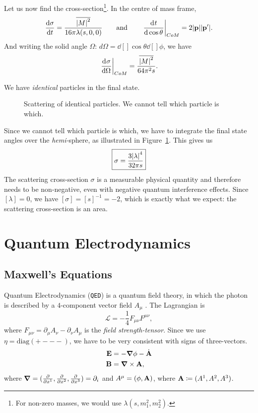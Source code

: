Let us now find the cross-section\footnote{For non-zero masses, we would use $\lambda(s, m_1^2, m_2^2)$.}. In the centre of mass frame, 
\begin{equation}
  \dv{\sigma}{t} = \frac{\overline{\abs{M}^2}}{16 \pi \lambda (s, {0, 0})} \qquad \text{and} \qquad \left.\dv[]{t}{\cos\theta}\right\rvert_{CoM} = 2 \abs{\vb{p}} \abs{\vb{p}'}.
\end{equation}
And writing the solid angle $\Omega$: $d\Omega = \dd[]{\cos\theta \dd[]{\phi}}$, we have
\begin{equation}
  \left.\dv[]{\sigma}{\Omega}\right\rvert_{CoM} = \frac{\overline{\abs{M}^2}}{64 \pi^2 s} .
\end{equation}

We have \emph{identical} particles in the final state.
\begin{figure}[tbhp]
  \centering
  \def\svgwidth{0.4\columnwidth}
  
  \caption{Scattering of identical particles. We cannot tell which particle is which.}
  \label{fig:l19f1}
\end{figure}
Since we cannot tell which particle is which, we have to integrate the final state angles over the \emph{hemi-}sphere, as illustrated in Figure~\ref{fig:l19f1}.
This gives us
\begin{equation}
  \boxed{\sigma = \frac{3 \abs{\lambda}^4}{32 \pi s}}
\end{equation}
The scattering cross-section $\sigma$  is a measurable physical quantity and therefore needs to be non-negative, even with negative quantum interference effects.
Since $[\lambda] = 0$, we have $[\sigma] = [s]^{-1} = -2$, which is exactly what we expect: the scattering cross-section is an area.

\chapter{Quantum Electrodynamics}%
\label{cha:quantum_electrodynamics}

\section{Maxwell's Equations}%
\label{sec:maxwell_s_equations}

Quantum Electrodynamics (\texttt{QED}) is a quantum field theory, in which the photon is described by a $4$-component vector field  $A_{\mu}$ . The Lagrangian is
\begin{equation}
  \mathcal{L} = -\frac{1}{4} F_{\mu\nu} F^{\mu\nu},
\end{equation}
where $F_{\mu\nu} = \partial_{\mu} A_{\nu} - \partial_{\nu} A_{\mu}$ is the \emph{field strength-tensor}.
Since we use $\eta = \text{diag}(+ - - -{})$, we have to be very consistent with signs of three-vectors.
\begin{align}
  \vb{E} &= - \grad \phi - \dot{\vb{A}} \label{eq:19-1} \\
  \vb{B} &= \grad \times \vb{A}, \label{eq:19-2}
\end{align}
where $\grad = (\frac{\partial }{\partial x^1}, \frac{\partial }{\partial x^2}, \frac{\partial }{\partial x^3}) = \partial_{i}$ and $A^{\mu} = (\phi, \vb{A})$, where $\vb{A} \coloneqq (A^1, A^2, A^3)$.

